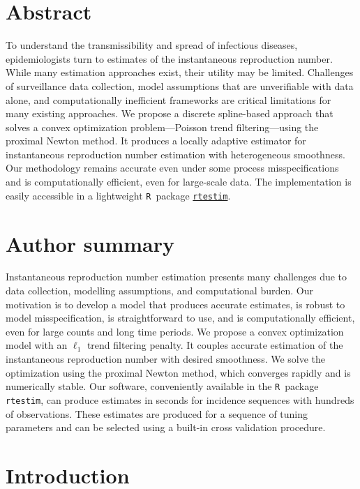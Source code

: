 \documentclass[10pt,letterpaper]{article}
\newcommand{\R}{\texttt{R}}
\begin{document}
\section*{Abstract}

To understand the transmissibility and spread of infectious diseases,
epidemiologists turn to estimates of the instantaneous reproduction number.
While many estimation approaches exist, their utility may be limited. 
Challenges of surveillance data collection, model assumptions
that are unverifiable with data alone, and 
computationally inefficient frameworks are critical limitations for many
existing approaches. We propose a discrete spline-based approach that solves a convex optimization problem---Poisson trend filtering---using the proximal Newton method. It produces a locally adaptive 
estimator for instantaneous reproduction number estimation with heterogeneous 
smoothness. Our methodology remains accurate even under some process 
misspecifications and is computationally efficient, even for large-scale 
data. The implementation is easily accessible in a lightweight \R\ 
package \href{https://dajmcdon.github.io/rtestim/index.html}{\texttt{rtestim}}.


\section*{Author summary}

Instantaneous reproduction number estimation presents many challenges due to data
collection, modelling assumptions, and computational burden. Our
motivation is to develop a model that produces accurate estimates, is robust to
model misspecification, is straightforward to use, and is computationally
efficient, even for large counts and long time periods. We propose a convex
optimization model with an $\ell_1$ trend filtering penalty. It couples accurate
estimation of the instantaneous reproduction number with desired smoothness. We
solve the optimization using the proximal Newton method, which converges rapidly
and is numerically stable. Our software, conveniently available in the \R\
package \texttt{rtestim}, can produce estimates in seconds for incidence sequences with
hundreds of observations. These estimates are produced for a sequence of tuning
parameters and can be selected using a built-in cross validation procedure. 

\linenumbers

\section{Introduction}
\label{sec:intro}
\end{document}
